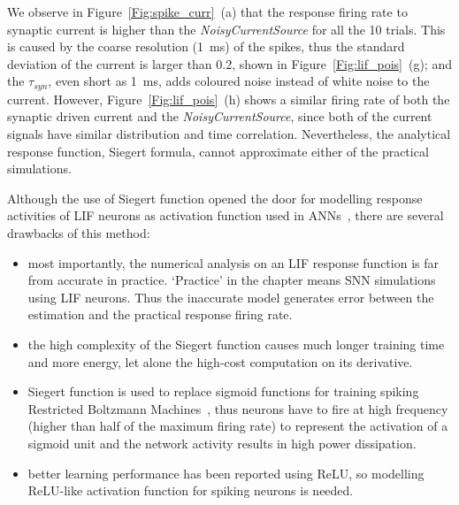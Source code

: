 	We observe in Figure~\ref{Fig:spike_curr}~(a) that the response firing rate to synaptic current is higher than the \textit{NoisyCurrentSource} for all the 10 trials.
	This is caused by the coarse resolution (1~ms) of the spikes, thus the standard deviation of the current is larger than 0.2, shown in Figure~\ref{Fig:lif_pois}~(g);
	and the $\tau_{syn}$, even short as 1~ms, adds coloured noise instead of white noise to the current.
	However, Figure~\ref{Fig:lif_pois}~(h) shows a similar firing rate of both the synaptic driven current and the \textit{NoisyCurrentSource}, since both of the current signals have similar distribution and time correlation.
	Nevertheless, the analytical response function, Siegert formula, cannot approximate either of the practical simulations.
	
	Although the use of Siegert function opened the door for modelling response activities of LIF neurons as activation function used in ANNs~\citep{Jug_etal_2012}, there are several drawbacks of this method:
	\begin{itemize}
		\item most importantly, the numerical analysis on an LIF response function is far from accurate in practice. `Practice' in the chapter means SNN simulations using LIF neurons.
		Thus the inaccurate model generates error between the estimation and the practical response firing rate.
		
		
		\item the high complexity of the Siegert function causes much longer training time and more energy, let alone the high-cost computation on its derivative.
		\item Siegert function is used to replace sigmoid functions for training spiking Restricted Boltzmann Machines~\citep{Jug_etal_2012}, thus neurons have to fire at high frequency (higher than half of the maximum firing rate) to represent the activation of a sigmoid unit and the network activity results in high power dissipation.
		\item better learning performance has been reported using ReLU, so modelling ReLU-like activation function for spiking neurons is needed.  
	\end{itemize}
	

